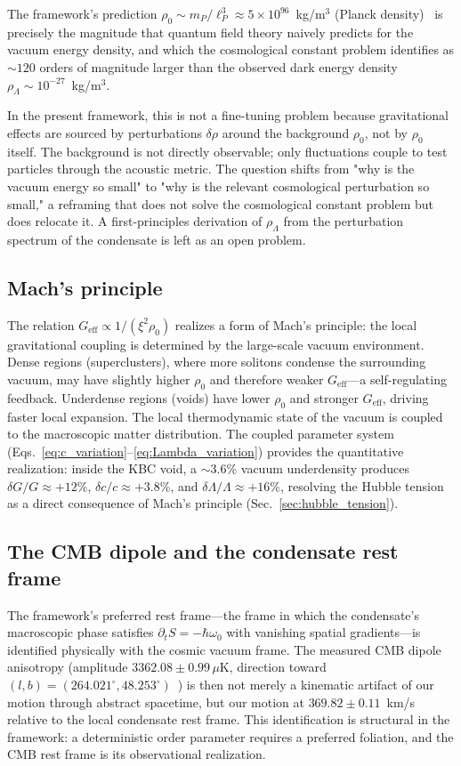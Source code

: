 \documentclass[12pt, a4paper]{article}
\newcommand{\Geff}{G_{\mathrm{eff}}}
\begin{document}
The framework's prediction $\rho_0 \sim m_P/\ell_P^3 \approx 5 \times 10^{96}$~kg/m$^3$ (Planck density)~\cite{kulangiev_2026e} is precisely the magnitude that quantum field theory naively predicts for the vacuum energy density, and which the cosmological constant problem identifies as $\sim 120$ orders of magnitude larger than the observed dark energy density $\rho_\Lambda \sim 10^{-27}$~kg/m$^3$.

In the present framework, this is not a fine-tuning problem because gravitational effects are sourced by perturbations $\delta\rho$ around the background $\rho_0$, not by $\rho_0$ itself. The background is not directly observable; only fluctuations couple to test particles through the acoustic metric. The question shifts from "why is the vacuum energy so small" to "why is the relevant cosmological perturbation so small," a reframing that does not solve the cosmological constant problem but does relocate it. A first-principles derivation of $\rho_\Lambda$ from the perturbation spectrum of the condensate is left as an open problem.

\subsection{Mach's principle}

The relation $\Geff \propto 1/(\xi^2\rho_0)$ realizes a form of Mach's principle: the local gravitational coupling is determined by the large-scale vacuum environment. Dense regions (superclusters), where more solitons condense the surrounding vacuum, may have slightly higher $\rho_0$ and therefore weaker $\Geff$---a self-regulating feedback. Underdense regions (voids) have lower $\rho_0$ and stronger $\Geff$, driving faster local expansion. The local thermodynamic state of the vacuum is coupled to the macroscopic matter distribution. The coupled parameter system (Eqs.~\ref{eq:c_variation}--\ref{eq:Lambda_variation}) provides the quantitative realization: inside the KBC void, a $\sim 3.6\%$ vacuum underdensity produces $\delta G/G \approx +12\%$, $\delta c/c \approx +3.8\%$, and $\delta\Lambda/\Lambda \approx +16\%$, resolving the Hubble tension as a direct consequence of Mach's principle (Sec.~\ref{sec:hubble_tension}).

\subsection{The CMB dipole and the condensate rest frame}

The framework's preferred rest frame---the frame in which the condensate's macroscopic phase satisfies $\partial_t S = -\hbar\omega_0$ with vanishing spatial gradients---is identified physically with the cosmic vacuum frame. The measured CMB dipole anisotropy (amplitude $3362.08 \pm 0.99\,\mu\mathrm{K}$, direction toward $(l,b) = (264.021^\circ, 48.253^\circ)$~\cite{planck_dipole_2020}) is then not merely a kinematic artifact of our motion through abstract spacetime, but our motion at $369.82 \pm 0.11$~km/s relative to the local condensate rest frame. This identification is structural in the framework: a deterministic order parameter requires a preferred foliation, and the CMB rest frame is its observational
realization.
\end{document}

